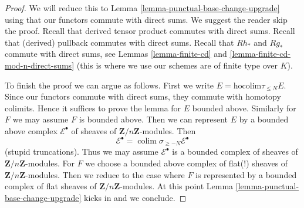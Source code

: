 \documentclass[10pt,a4paper]{amsart}
\theoremstyle{plain}
\theoremstyle{definition}
\theoremstyle{remark}
\numberwithin{equation}{subsection}
\def\colim{\mathop{\mathrm{colim}}\nolimits}
\begin{document}
\begin{proof}
We will reduce this to
Lemma \ref{lemma-punctual-base-change-upgrade}
using that our functors commute with direct sums.
We suggest the reader skip the proof.
Recall that derived tensor product commutes with
direct sums. Recall that (derived) pullback commutes with direct sums.
Recall that $Rh_*$ and $Rg_*$ commute with direct sums, see
Lemmas \ref{lemma-finite-cd} and
\ref{lemma-finite-cd-mod-n-direct-sums}
(this is where we use our schemes are of finite type
over $K$).

\medskip\noindent
To finish the proof we can argue as follows.
First we write $E = \text{hocolim} \tau_{\leq N} E$.
Since our functors commute with direct sums, they commute
with homotopy colimits. Hence it suffices to prove
the lemma for $E$ bounded above. Similarly for $F$ we
may assume $F$ is bounded above.
Then we can represent $E$ by a bounded above complex
$\mathcal{E}^\bullet$ of sheaves of $\mathbf{Z}/n\mathbf{Z}$-modules.
Then
$$
\mathcal{E}^\bullet = \colim \sigma_{\geq -N}\mathcal{E}^\bullet
$$
(stupid truncations).
Thus we may assume $\mathcal{E}^\bullet$ is a bounded
complex of sheaves of $\mathbf{Z}/n\mathbf{Z}$-modules.
For $F$ we choose a bounded above complex of
flat(!) sheaves of $\mathbf{Z}/n\mathbf{Z}$-modules.
Then we reduce to the case where $F$ is represented
by a bounded complex of flat sheaves of $\mathbf{Z}/n\mathbf{Z}$-modules.
At this point Lemma \ref{lemma-punctual-base-change-upgrade}
kicks in and we conclude.
\end{proof}
\end{document}
